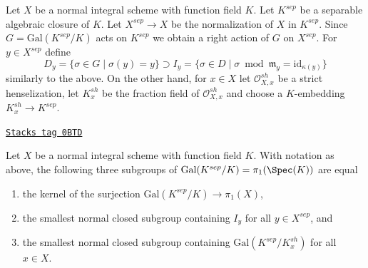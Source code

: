 Let $X$ be a normal integral scheme with function field $K$.
Let $K^{sep}$ be a separable algebraic closure of $K$.
Let $X^{sep} \to X$ be the normalization of $X$ in $K^{sep}$.
Since $G = \text{Gal}(K^{sep}/K)$ acts on $K^{sep}$
we obtain a right action of $G$ on $X^{sep}$.
For $y \in X^{sep}$ define
$$
D_y = \{\sigma \in G \mid \sigma(y) = y\} \supset
I_y = \{\sigma \in D \mid \sigma \bmod \mathfrak m_y =
\text{id}_{\kappa(y)} \}
$$
similarly to the above. On the other hand, for $x \in X$
let $\mathcal{O}_{X, x}^{sh}$ be a strict henselization,
let $K_x^{sh}$ be the fraction field of $\mathcal{O}_{X, x}^{sh}$
and choose a $K$-embedding $K_x^{sh} \to K^{sep}$.

\begin{lemma}
\label{pione-lemma-normal-pione-quotient-inertia}
\href{https://stacks.math.columbia.edu/tag/0BTD}{\texttt{Stacks tag 0BTD}}

Let $X$ be a normal integral scheme with function field $K$.
With notation as above, the following three subgroups of
$\text{Gal}(K^{sep}/K) = \pi_1(\Spec(K))$
are equal
\begin{enumerate}
\item the kernel of the surjection
$\text{Gal}(K^{sep}/K) \longrightarrow \pi_1(X)$,
\item the smallest normal closed subgroup containing $I_y$
for all $y \in X^{sep}$, and
\item the smallest normal closed subgroup containing
$\text{Gal}(K^{sep}/K_x^{sh})$ for all $x \in  X$.
\end{enumerate}
\end{lemma}

